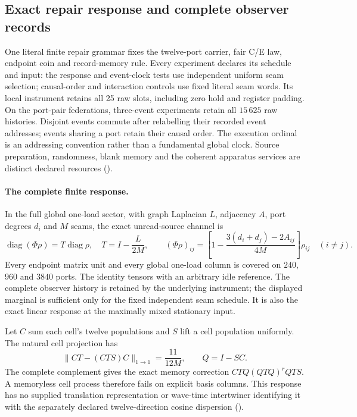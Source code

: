 \subsection{Exact repair response and complete observer records}

One literal finite repair grammar fixes the twelve-port carrier, fair C/E
law, endpoint coin and record-memory rule. Every experiment declares its
schedule and input: the response and event-clock tests use independent
uniform seam selection; causal-order and interaction controls use fixed
literal seam words. Its local instrument retains all 25 raw slots,
including zero hold and register padding. On the port-pair federations,
three-event experiments retain all $15\,625$ raw histories. Disjoint
events commute after relabelling their recorded event addresses; events
sharing a port retain their causal order. The execution ordinal is an
addressing convention rather than a fundamental global clock. Source
preparation, randomness, blank memory and the coherent apparatus services
are distinct declared resources
().

\paragraph{The complete finite response.}
In the full global one-load sector, with graph Laplacian $L$, adjacency
$A$, port degrees $d_i$ and $M$ seams, the exact unread-source channel is
\[
 \operatorname{diag}(\Phi\rho)=T\operatorname{diag}\rho,
 \quad T=I-\frac L{2M},\qquad
 (\Phi\rho)_{ij}=\left[1-\frac{3(d_i+d_j)-2A_{ij}}{4M}\right]\rho_{ij}
 \quad(i\ne j).
\]
Every endpoint matrix unit and every global one-load column is covered
on $240$, $960$ and $3840$ ports. The identity tensors with an arbitrary
idle reference. The complete observer history is retained by the underlying
instrument; the displayed marginal is sufficient only for the fixed
independent seam schedule. It is also the exact linear response at the
maximally mixed stationary input.

Let $C$ sum each cell's twelve populations and $S$ lift a cell population
uniformly. The natural cell projection has
\[
 \|CT-(CTS)C\|_{1\to1}=\frac{11}{12M},\qquad
 Q=I-SC.
\]
The complete complement gives the exact memory correction
$CTQ(QTQ)^rQTS$. A memoryless cell process therefore fails on explicit
basis columns. This response has no supplied translation representation
or wave-time intertwiner identifying it with the separately declared
twelve-direction cosine dispersion
().

